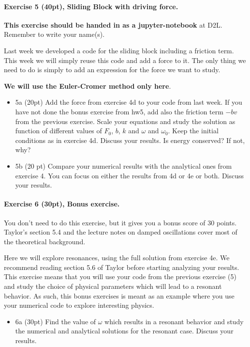 \documentclass[%
oneside,                 %
final,                   %
10pt]{article}
\begin{document}
\paragraph{Exercise 5 (40pt), Sliding Block with driving force.}
\textbf{This exercise should be handed in as a jupyter-notebook} at D2L. Remember to write your name(s). 

Last week we developed a code for the sliding block including a friction term. This week we will simply reuse this code and add a force to it. The only thing we need to do is simply to add an expression for the force we want to study.

\textbf{We will use the Euler-Cromer method only here}.

\begin{itemize}
\item 5a (20pt) Add the force from exercise 4d to your code from last week. If you have not done the bonus exercise from hw5, add also the friction term $-bv$ from the previous exercise. Scale your equations and study the solution as function of different values of $F_0$, $b$, $k$ and $\omega$ and $\omega_0$. Keep the initial conditions as in exercise 4d. Discuss your results. Is energy conserved? If not, why? 

\item 5b (20 pt)  Compare your numerical results with the analytical ones from exercise 4. You can focus on either the results from 4d or 4e or both.  Discuss your results. 
\end{itemize}

\noindent
\paragraph{Exercise 6 (30pt), Bonus exercise.}
You don't need to do this exercise, but it gives you a bonus score of 30 points. Taylor's section 5.4 and the lecture notes on damped oscillations cover most of the theoretical background.

Here we will explore resonances, using the full solution from exercise
4e.  We recommend reading section 5.6 of Taylor before starting
analyzing your results.  This exercise means that you will use your
code from the previous exercise (5) and study the choice of physical
parameters which will lead to a resonant behavior. As such, this bonus
exercises is meant as an example where you use your numerical code to
explore interesting physics.

\begin{itemize}
\item 6a (30pt)  Find the value of $\omega$ which results in a resonant behavior and study the numerical and analytical solutions for the resonant case. Discuss your results. 
\end{itemize}

\noindent

\end{document}
